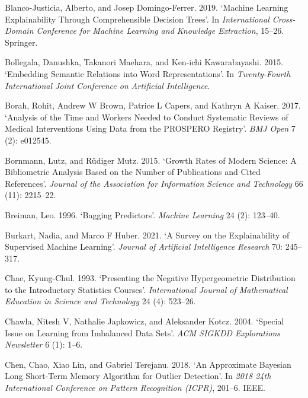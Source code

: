\documentclass{article}
\newlength{\cslhangindent}
\newlength{\cslentryspacingunit} %
\newenvironment{CSLReferences}[2] %
 {%
  \setlength{\parindent}{0pt}
  \ifodd #1
  \let\oldpar\par
  \def\par{\hangindent=\cslhangindent\oldpar}
  \fi
  \setlength{\parskip}{#2\cslentryspacingunit}
 }%
 {}
\begin{document}
\begin{CSLReferences}{1}{0}
\leavevmode{}%
Blanco-Justicia, Alberto, and Josep Domingo-Ferrer. 2019. {`Machine
Learning Explainability Through Comprehensible Decision Trees'}. In
\emph{International Cross-Domain Conference for Machine Learning and
Knowledge Extraction}, 15--26. Springer.

\leavevmode{}%
Bollegala, Danushka, Takanori Maehara, and Ken-ichi Kawarabayashi. 2015.
{`Embedding Semantic Relations into Word Representations'}. In
\emph{Twenty-Fourth International Joint Conference on Artificial
Intelligence}.

\leavevmode{}%
Borah, Rohit, Andrew W Brown, Patrice L Capers, and Kathryn A Kaiser.
2017. {`Analysis of the Time and Workers Needed to Conduct Systematic
Reviews of Medical Interventions Using Data from the PROSPERO
Registry'}. \emph{BMJ Open} 7 (2): e012545.

\leavevmode{}%
Bornmann, Lutz, and Rüdiger Mutz. 2015. {`Growth Rates of Modern
Science: A Bibliometric Analysis Based on the Number of Publications and
Cited References'}. \emph{Journal of the Association for Information
Science and Technology} 66 (11): 2215--22.

\leavevmode{}%
Breiman, Leo. 1996. {`Bagging Predictors'}. \emph{Machine Learning} 24
(2): 123--40.

\leavevmode{}%
Burkart, Nadia, and Marco F Huber. 2021. {`A Survey on the
Explainability of Supervised Machine Learning'}. \emph{Journal of
Artificial Intelligence Research} 70: 245--317.

\leavevmode{}%
Chae, Kyung-Chul. 1993. {`Presenting the Negative Hypergeometric
Distribution to the Introductory Statistics Courses'}.
\emph{International Journal of Mathematical Education in Science and
Technology} 24 (4): 523--26.

\leavevmode{}%
Chawla, Nitesh V, Nathalie Japkowicz, and Aleksander Kotcz. 2004.
{`Special Issue on Learning from Imbalanced Data Sets'}. \emph{ACM
SIGKDD Explorations Newsletter} 6 (1): 1--6.

\leavevmode{}%
Chen, Chao, Xiao Lin, and Gabriel Terejanu. 2018. {`An Approximate
Bayesian Long Short-Term Memory Algorithm for Outlier Detection'}. In
\emph{2018 24th International Conference on Pattern Recognition (ICPR)},
201--6. IEEE.


\end{CSLReferences}
\end{document}
